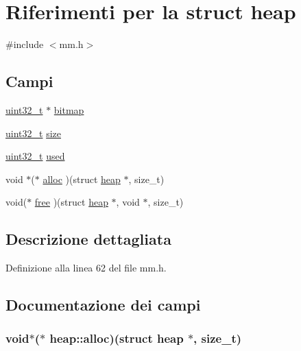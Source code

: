 \hypertarget{structheap}{\section{Riferimenti per la struct heap}
\label{structheap}
}


{\ttfamily \#include $<$mm.\+h$>$}

\subsection*{Campi}
\begin{DoxyCompactItemize}
\item 
\hyperlink{aplus_8h_a53a0df51603c77c2aa5b9ea61b606a82}{uint32\+\_\+t} $\ast$ \hyperlink{structheap_a5243ef46c552fc0968aa2bcdaf6725d1}{bitmap}
\item 
\hyperlink{aplus_8h_a53a0df51603c77c2aa5b9ea61b606a82}{uint32\+\_\+t} \hyperlink{structheap_a486fb531d24b9ee5f17b7ffe96689705}{size}
\item 
\hyperlink{aplus_8h_a53a0df51603c77c2aa5b9ea61b606a82}{uint32\+\_\+t} \hyperlink{structheap_a37f3f6d6d39562f3cca452eafebcd7ac}{used}
\item 
void $\ast$($\ast$ \hyperlink{structheap_a8b4bc8c3f0ed79efd52d61a27a62a130}{alloc} )(struct \hyperlink{structheap}{heap} $\ast$, size\+\_\+t)
\item 
void($\ast$ \hyperlink{structheap_ae53b14c50bbb9daab4346cd0873bda02}{free} )(struct \hyperlink{structheap}{heap} $\ast$, void $\ast$, size\+\_\+t)
\end{DoxyCompactItemize}


\subsection{Descrizione dettagliata}


Definizione alla linea 62 del file mm.\+h.



\subsection{Documentazione dei campi}
\hypertarget{structheap_a8b4bc8c3f0ed79efd52d61a27a62a130}{
\subsubsection[{alloc}]{\setlength{\rightskip}{0pt plus 5cm}void$\ast$($\ast$ heap\+::alloc)(struct {\bf heap} $\ast$, size\+\_\+t)}}\label{structheap_a8b4bc8c3f0ed79efd52d61a27a62a130}



